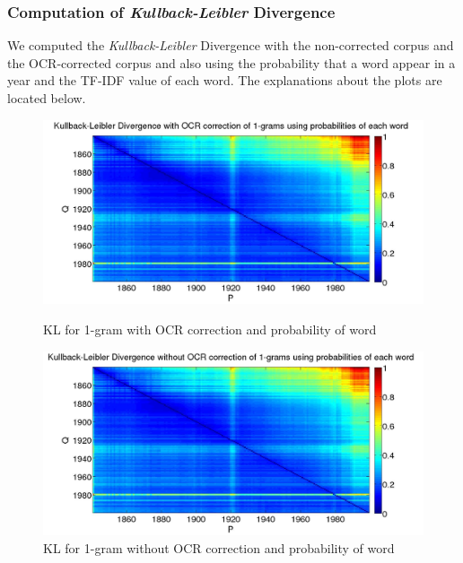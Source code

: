 \subsubsection{Computation of \emph{Kullback-Leibler} Divergence}
We computed the \emph{Kullback-Leibler} Divergence with the non-corrected corpus and the OCR-corrected corpus and also using the probability that a word appear in a year and the TF-IDF value of each word. The explanations about the plots are located below.

\begin{figure}[h!]
    \begin{minipage}[b]{0.48\linewidth}
        \includegraphics[scale=0.15]{Pictures/kullback-leibler/KL_1-grams_with_correction_proba.jpg}
        \caption{KL for 1-gram with OCR correction and probability of word}
        \label{KL-PC1}
    \end{minipage}\hfill
    \begin{minipage}[b]{0.5\linewidth}
        \includegraphics[scale=0.15]{Pictures/kullback-leibler/KL_1-grams_without_correction_proba.jpg}
        \caption{KL for 1-gram without OCR correction and probability of word}
        \label{KL-PN1}
    \end{minipage}\hfill
\end{figure}

